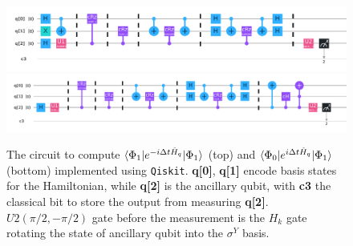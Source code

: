 \documentclass[journal=jctcce,manuscript=article]{achemso}
\begin{document}
\begin{figure}[h!]
  \centering
  \includegraphics[width=6.5in]{figs/phi1_cir4y.pdf}
  \includegraphics[width=6.5in]{figs/phi0+e1_cir_y.pdf}
  \caption{The circuit to compute $\braket{\Phi_1  | e^{-i \Delta t \hat{H}_q}  |  \Phi_1}$ (top) and $\braket{\Phi_0  | e^{i \Delta t \hat{H}_q}  |  \Phi_1}$ (bottom) implemented using \texttt{Qiskit}\cite{Qiskit}. \textbf{q[0]}, \textbf{q[1] }encode basis states for the Hamiltonian, while \textbf{q[2]} is the ancillary qubit, with \textbf{c3} the classical bit to store the output from measuring \textbf{q[2]}. $U2(\pi/2, -\pi/2)$ gate before the measurement is the $H_k$ gate rotating the state of ancillary qubit into the $\sigma^Y$ basis.  }
\label{h2_cir}
\end{figure}

\end{document}
